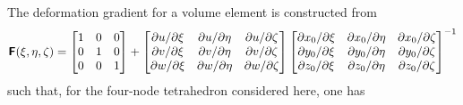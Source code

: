 The deformation gradient for a volume element is constructed from
\small
\begin{equation}
    \boldsymbol{\mathsf{F}} ( \xi , \eta , \zeta ) = \begin{bmatrix} 1 & 0 & 0 \\
    0 & 1 & 0 \\ 0 & 0 & 1 \end{bmatrix} + \begin{bmatrix}
    \partial u / \partial \xi & \partial u / \partial \eta & \partial u / \partial \zeta \\
    \partial v / \partial \xi & \partial v / \partial \eta & \partial v / \partial \zeta \\
    \partial w / \partial \xi & \partial w / \partial \eta & \partial w / \partial \zeta
    \end{bmatrix} \begin{bmatrix}
    \partial x_0 / \partial \xi & \partial x_0 / \partial \eta & \partial x_0 / \partial \zeta \\
    \partial y_0 / \partial \xi & \partial y_0 / \partial \eta & \partial y_0 / \partial \zeta \\
    \partial z_0 / \partial \xi & \partial z_0 / \partial \eta & \partial z_0 / \partial \zeta
    \end{bmatrix}^{-1}
\end{equation}
\normalsize
such that, for the four-node tetrahedron considered here, one has

